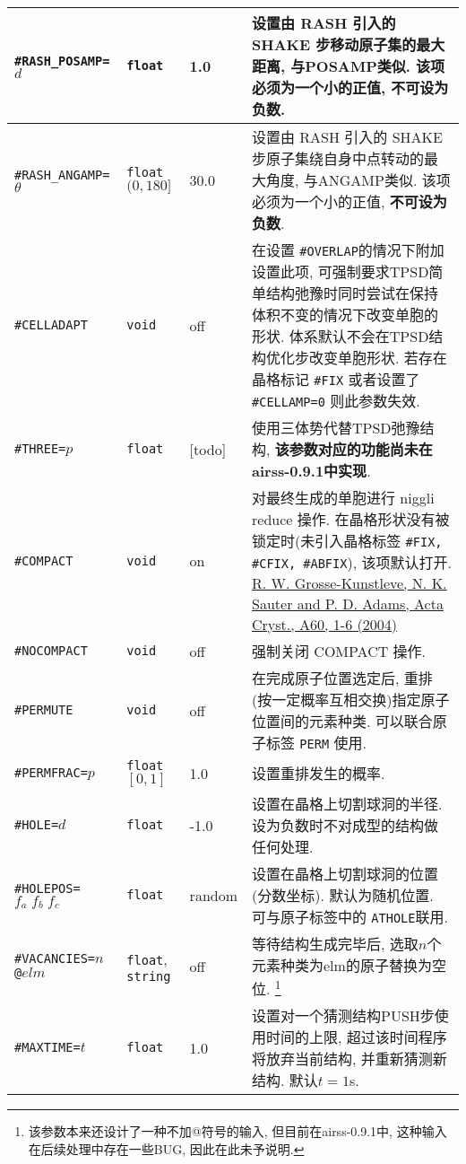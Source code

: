 \documentclass[a4paper, 10pt]{article}
\begin{document}
\begin{center}
\begin{longtable}{m{11em}|m{4em}<{\centering}|m{3em}<{\centering}|m{15em}}
\midrule
 \verb|#RASH_POSAMP=|\(d\)& \verb|float| & 1.0 & 设置由 RASH 引入的 SHAKE 步移动原子集的最大距离, 与POSAMP类似. 该项必须为一个小的正值, \textbf{不可设为负数}.\\
\midrule
 \verb|#RASH_ANGAMP=|\(\theta\) & \verb|float| \((0,180]\) & 30.0 & 设置由 RASH 引入的 SHAKE 步原子集绕自身中点转动的最大角度, 与ANGAMP类似. 该项必须为一个小的正值, \textbf{不可设为负数}.\\
\midrule
 \verb|#CELLADAPT|& \verb|void| & off & 在设置 \verb|#OVERLAP|的情况下附加设置此项, 可强制要求TPSD简单结构弛豫时同时尝试在保持体积不变的情况下改变单胞的形状. 体系默认不会在TPSD结构优化步改变单胞形状. 若存在晶格标记 \verb|#FIX| 或者设置了 \verb|#CELLAMP=0| 则此参数失效. \\
\midrule
 \verb|#THREE=|\(p\)& \verb|float| & [todo] & 使用三体势代替TPSD弛豫结构, \textbf{该参数对应的功能尚未在airss-0.9.1中实现}.\\
\midrule
 \verb|#COMPACT|& \verb|void| & on & 对最终生成的单胞进行 niggli reduce 操作. 在晶格形状没有被锁定时(未引入晶格标签 \verb|#FIX, #CFIX, #ABFIX|), 该项默认打开. \href{http://atztogo.github.io/niggli/#algorithm}{R. W. Grosse-Kunstleve, N. K. Sauter and P. D. Adams, Acta Cryst., A60, 1-6 (2004)} \\
\midrule
 \verb|#NOCOMPACT| & \verb|void| & off & 强制关闭 COMPACT 操作.\\
\midrule
 \verb|#PERMUTE| & \verb|void| & off & 在完成原子位置选定后, 重排(按一定概率互相交换)指定原子位置间的元素种类. 可以联合原子标签 \verb|PERM| 使用.\\
\midrule
 \verb|#PERMFRAC=|\(p\) & \verb|float| \([0,1]\)  & 1.0 & 设置重排发生的概率.\\
\midrule
 \verb|#HOLE=|\(d\) & \verb|float| & -1.0 & 设置在晶格上切割球洞的半径. 设为负数时不对成型的结构做任何处理.\\
\midrule
 \verb|#HOLEPOS=|\(f_a\;f_b\;f_c\) & \verb|float| & random & 设置在晶格上切割球洞的位置(分数坐标). 默认为随机位置. 可与原子标签中的 \verb|ATHOLE|联用.\\
\midrule
 \verb|#VACANCIES=|\(n\) \verb|@|\(elm\)& \verb|float|, \verb|string| & off & 等待结构生成完毕后, 选取\(n\)个元素种类为elm的原子替换为空位. \footnote{该参数本来还设计了一种不加@符号的输入, 但目前在airss-0.9.1中, 这种输入在后续处理中存在一些BUG, 因此在此未予说明.}\\
\midrule
 \verb|#MAXTIME=|\(t\)& \verb|float| & 1.0 & 设置对一个猜测结构PUSH步使用时间的上限, 超过该时间程序将放弃当前结构, 并重新猜测新结构. 默认\(t=1\)s.\\

\end{longtable}
\end{center}
\end{document}
